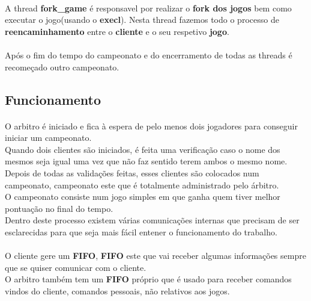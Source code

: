 \documentclass[letterpaper, 11pt]{article}
\begin{document}
\paragraph{}
A thread \textbf{fork\_game} é responsavel por realizar o \textbf{fork dos jogos} bem como executar o jogo(usando o \textbf{execl}). Nesta thread fazemos todo o processo de \textbf{reencaminhamento} entre o \textbf{cliente} e o seu respetivo \textbf{jogo}.
\paragraph{}
Após o fim do tempo do campeonato e do encerramento de todas as threads é recomeçado outro campeonato. 

\subsection{Funcionamento}
\label{sec:org911495d}

\paragraph{}
O arbitro é iniciado e fica à espera de pelo menos dois jogadores para conseguir iniciar um campeonato.\\
Quando dois clientes são iniciados, é feita uma verificação caso o nome dos mesmos seja igual uma vez que não faz sentido terem ambos o mesmo nome.\\
Depois de todas as validações feitas, esses clientes são colocados num campeonato, campeonato este que é totalmente administrado pelo árbitro.\\
O campeonato consiste num jogo simples em que ganha quem tiver melhor pontuação no final do tempo.\\
Dentro deste processo existem várias comunicações internas que precisam de ser esclarecidas para que seja mais fácil entener o funcionamento do trabalho.
\paragraph{}
O cliente gere um \textbf{FIFO}, \textbf{FIFO} este que vai receber algumas informações sempre que se quiser comunicar com o cliente.\\
O arbitro também tem um \textbf{FIFO} próprio que é usado para receber comandos vindos do cliente, comandos pessoais, não relativos aos jogos.
\end{document}
